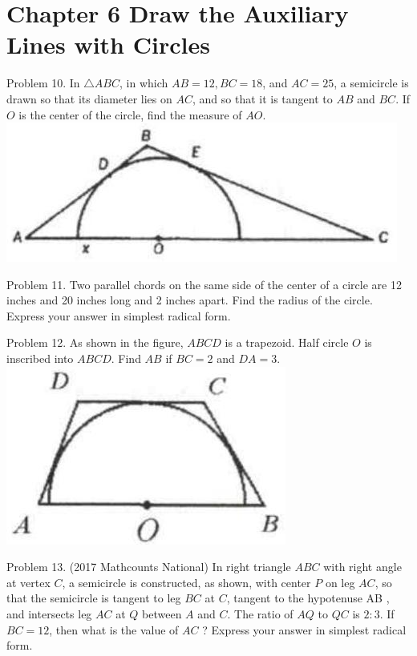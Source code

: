 \documentclass[10pt]{article}
\begin{document}
\section*{Chapter 6 Draw the Auxiliary Lines with Circles}
Problem 10. In \(\triangle A B C\), in which \(A B=12, B C=18\), and \(A C=25\), a semicircle is drawn so that its diameter lies on \(A C\), and so that it is tangent to \(A B\) and \(B C\). If \(O\) is the center of the circle, find the measure of \(A O\).\\
\includegraphics[max width=\textwidth, center]{2025_04_17_97bc1f7e44d93c271a88g-156}

Problem 11. Two parallel chords on the same side of the center of a circle are 12 inches and 20 inches long and 2 inches apart. Find the radius of the circle. Express your answer in simplest radical form.

Problem 12. As shown in the figure, \(A B C D\) is a trapezoid. Half circle \(O\) is inscribed into \(A B C D\). Find \(A B\) if \(B C=2\) and \(D A=3\).\\
\includegraphics[max width=\textwidth, center]{2025_04_17_97bc1f7e44d93c271a88g-156(1)}

Problem 13. (2017 Mathcounts National) In right triangle \(A B C\) with right angle at vertex \(C\), a semicircle is constructed, as shown, with center \(P\) on leg \(A C\), so that the semicircle is tangent to leg \(B C\) at \(C\), tangent to the hypotenuse AB , and intersects leg \(A C\) at \(Q\) between \(A\) and \(C\). The ratio of \(A Q\) to \(Q C\) is \(2: 3\). If \(B C=12\), then what is the value of \(A C\) ? Express your answer in simplest radical form.
\end{document}
